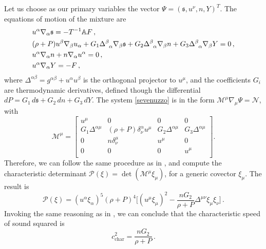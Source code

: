 \documentclass[aps,prl,noshowpacs,noshowkeys,floatfix,superscriptaddress,singlecolum,nofootinbib]{revtex4-2}
\theoremstyle{definition}
\theoremstyle{theorem}
\begin{document}
Let us choose as our primary variables the vector $\Psi=(\mathfrak{s},u^\nu,n,Y)^T$. The equations of motion of the mixture are
\begin{equation}\label{sevenuzzo}
    \begin{split}
& u^\alpha \nabla_\alpha \mathfrak{s}= -T^{-1} \mathbb{A}F \, , \\
& (\rho+P)u^\beta \nabla_\beta u_\alpha +G_1\Delta\indices{^\beta _\alpha} \nabla_\beta \mathfrak{s}+G_2\Delta\indices{^\beta _\alpha} \nabla_\beta n+G_3\Delta\indices{^\beta _\alpha} \nabla_\beta Y=0 \, , \\
& u^\alpha \nabla_\alpha n +n \nabla_\alpha u^\alpha =0 \, , \\
& u^\alpha \nabla_\alpha Y =-F \, ,
    \end{split}
\end{equation}
where $\Delta^{\alpha \beta}=g^{\alpha \beta}+u^\alpha u^\beta$ is the orthogonal projector to $u^\mu$, and the coefficients $G_i$ are thermodynamic derivatives, defined though the differential $dP=G_1 \, d\mathfrak{s}+G_2 \, dn +G_3 \, dY$. The system \eqref{sevenuzzo} is in the form $\mathcal{M}^\mu \nabla_\mu \Psi=\mathcal{N}$, with
\begin{equation}
    \mathcal{M}^\mu =
    \begin{bmatrix}
        u^\mu & 0 & 0 & 0 \\
        G_1 \Delta^{\alpha \mu} & (\rho+P) \delta^\alpha_\nu u^\mu & G_2 \Delta^{\alpha \mu} & G_3 \Delta^{\alpha \mu} \\
        0 & n\delta^\mu_\nu & u^\mu & 0 \\
        0 & 0 & 0 & u^\mu \\
    \end{bmatrix} .
\end{equation}
Therefore, we can follow the same procedure as in \cite{Causality_bulk}, and compute the characteristic determinant $\mathcal{P}(\xi)=\det(\mathcal{M}^\mu \xi_\mu)$, for a generic covector $\xi_\mu$. The result is
\begin{equation}\label{expectopatronum}
    \mathcal{P}(\xi)= (u^\alpha \xi_\alpha)^5 (\rho+P)^4 \bigg[ (u^\mu \xi_\mu)^2- \dfrac{nG_2}{\rho+P} \Delta^{\mu \nu}\xi_\mu \xi_\nu \bigg] \, .
\end{equation}
Invoking the same reasoning as in \cite{Causality_bulk}, we can conclude that the characteristic speed of sound squared is
\begin{equation}
    c_{\text{char}}^2 = \dfrac{nG_2}{\rho+P}  \, .
\end{equation}
\end{document}
